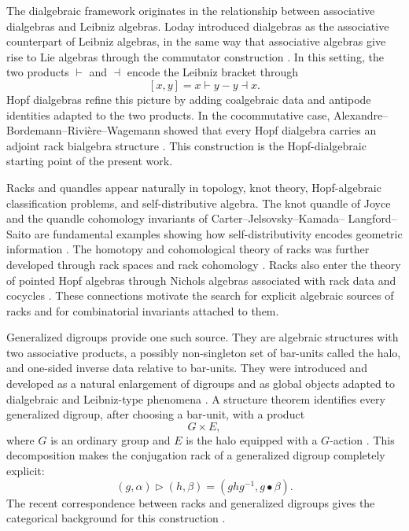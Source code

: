 \documentclass[11pt]{article}
\theoremstyle{plain}
\theoremstyle{definition}
\theoremstyle{remark}
\begin{document}
	The dialgebraic framework originates in the relationship between associative
	dialgebras and Leibniz algebras. Loday introduced dialgebras as the associative
	counterpart of Leibniz algebras, in the same way that associative algebras give
	rise to Lie algebras through the commutator construction \cite{Loday2001}.
	In this setting, the two products \(\vdash\) and \(\dashv\) encode the Leibniz
	bracket through
	\[
	[x,y]=x\vdash y-y\dashv x.
	\]
	Hopf dialgebras refine this picture by adding coalgebraic data and antipode
	identities adapted to the two products. In the cocommutative case,
	Alexandre--Bordemann--Rivi\`ere--Wagemann showed that every Hopf dialgebra
	carries an adjoint rack bialgebra structure \cite{ABRW1}. This construction is
	the Hopf-dialgebraic starting point of the present work.
	
	Racks and quandles appear naturally in topology, knot theory, Hopf-algebraic
	classification problems, and self-distributive algebra. The knot quandle of
	Joyce and the quandle cohomology invariants of Carter--Jelsovsky--Kamada--
	Langford--Saito are fundamental examples showing how self-distributivity
	encodes geometric information \cite{Joyce1982,Carter2003}. The homotopy and
	cohomological theory of racks was further developed through rack spaces and
	rack cohomology \cite{FennRourkeSanderson1995,EtingofGrana2003}. Racks also
	enter the theory of pointed Hopf algebras through Nichols algebras associated
	with rack data and cocycles \cite{AndruskiewitschGrana2003}. These connections
	motivate the search for explicit algebraic sources of racks and for
	combinatorial invariants attached to them.
	
	Generalized digroups provide one such source. They are algebraic structures
	with two associative products, a possibly non-singleton set of bar-units called
	the halo, and one-sided inverse data relative to bar-units. They were introduced
	and developed as a natural enlargement of digroups and as global objects
	adapted to dialgebraic and Leibniz-type phenomena \cite{SVW,RSV}. A structure
	theorem identifies every generalized digroup, after choosing a bar-unit, with a
	product
	\[
	G\times E,
	\]
	where \(G\) is an ordinary group and \(E\) is the halo equipped with a
	\(G\)-action \cite{RSV4}. This decomposition makes the conjugation rack of a
	generalized digroup completely explicit:
	\[
	(g,\alpha)\triangleright(h,\beta)
	=
	(ghg^{-1},g\bullet\beta).
	\]
	The recent correspondence between racks and generalized digroups gives the
	categorical background for this construction \cite{RSGD}.
	
\end{document}
